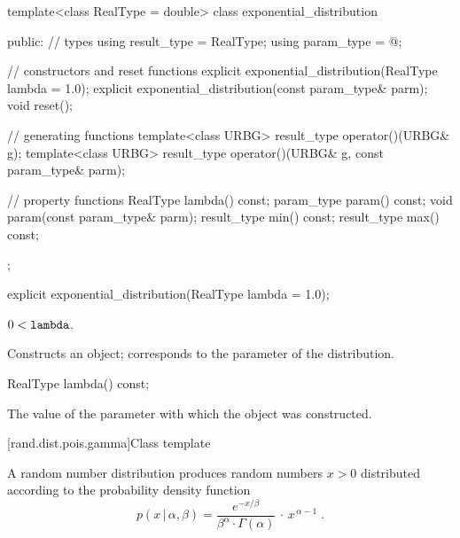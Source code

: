 %
\begin{codeblock}
template<class RealType = double>
  class exponential_distribution {
  public:
    // types
    using result_type = RealType;
    using param_type  = @\unspec@;

    // constructors and reset functions
    explicit exponential_distribution(RealType lambda = 1.0);
    explicit exponential_distribution(const param_type& parm);
    void reset();

    // generating functions
    template<class URBG>
      result_type operator()(URBG& g);
    template<class URBG>
      result_type operator()(URBG& g, const param_type& parm);

    // property functions
    RealType lambda() const;
    param_type param() const;
    void param(const param_type& parm);
    result_type min() const;
    result_type max() const;
  };
\end{codeblock}


%
\begin{itemdecl}
explicit exponential_distribution(RealType lambda = 1.0);
\end{itemdecl}

\begin{itemdescr}
\pnum\requires
 $ 0 < \texttt{\protect lambda} $.

\pnum\effects Constructs an  object;
 corresponds to the parameter of the distribution.
\end{itemdescr}

%
\begin{itemdecl}
RealType lambda() const;
\end{itemdecl}

\begin{itemdescr}
\pnum\returns The value of the  parameter
 with which the object was constructed.
\end{itemdescr}


[rand.dist.pois.gamma]{Class template }%
%
%

\pnum
A  random number distribution
produces random numbers $x > 0$
distributed according to
the probability density function%
%
%
\[%
 p(x\,|\,\alpha,\beta)
      = \frac{e^{-x/\beta}}{\beta^{\alpha} \cdot \Gamma(\alpha)}
        \, \cdot \, x^{\, \alpha-1}
\; \mbox{.}
\]

